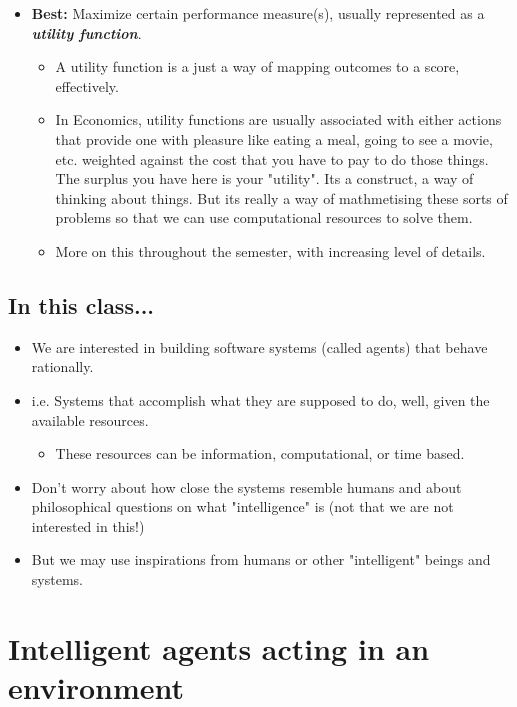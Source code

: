 \documentclass[12pt]{article}
\begin{document}
\begin{itemize}
\begin{itemize}
\begin{itemize}
        \end{itemize}
        \item \textbf{Best:} Maximize certain performance measure(s), usually represented as a \textbf{\emph{utility function}}. 
        \begin{itemize}
            \item A utility function is a just a way of mapping outcomes to a score, effectively.
            \item In Economics, utility functions are usually associated with either actions that provide one with pleasure like eating a meal, going to see a movie, etc. weighted against the cost that you have to pay to do those things. The surplus you have here is your "utility". Its a construct, a way of thinking about things. But its really a way of mathmetising these sorts of problems so that we can use computational resources to solve them. 
            \item More on this throughout the semester, with increasing level of details.
        \end{itemize}
    \end{itemize}
\end{itemize}

\newline
\subsection*{In this class...}

\begin{itemize}
    \item We are interested in building software systems (called agents) that behave rationally.
    \item i.e. Systems that accomplish what they are supposed to do, well, given the available resources.
    \begin{itemize}
        \item These resources can be information, computational, or time based. 
    \end{itemize}
    \item Don't worry about how close the systems resemble humans and about philosophical questions on what "intelligence" is (not that we are not interested in this!)
    \item But we may use inspirations from humans or other "intelligent" beings and systems.
\end{itemize}

\newpage
\section*{Intelligent agents acting in an environment}
\end{document}
